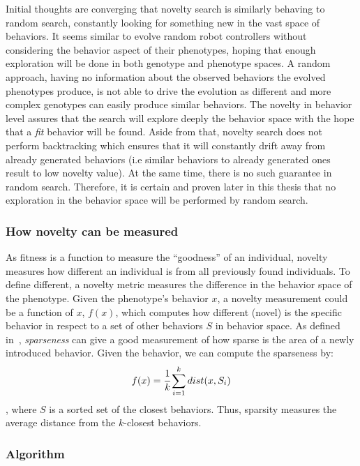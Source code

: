 Initial thoughts are converging that novelty search is similarly behaving to random search, constantly looking for something new in the vast space of behaviors. It seems similar to evolve random robot controllers without considering the behavior aspect of their phenotypes, hoping that enough exploration will be done in both genotype and phenotype spaces. A random approach, having no information about the observed behaviors the evolved phenotypes produce, is not able to drive the evolution as different and more complex genotypes can easily produce similar behaviors. The novelty in behavior level assures that the search will explore deeply the behavior space with the hope that a \emph{fit} behavior will be found. Aside from that, novelty search does not perform backtracking which ensures that it will constantly drift away from already generated behaviors (i.e similar behaviors to already generated ones result to low novelty value). At the same time, there is no such guarantee in random search. Therefore, it is certain and proven later in this thesis that no exploration in the behavior space will be performed by random search.



\subsubsection*{How novelty can be measured}

As fitness is a function to measure the ``goodness'' of an individual, novelty measures how different an individual is from all previously found individuals. To define different, a novelty metric measures the difference in the behavior space of the phenotype. Given the phenotype's behavior $x$, a novelty measurement could be a function of $x$, $f(x)$, which computes how different (novel) is the specific behavior in respect to a set of other behaviors $S$ in behavior space.  As defined in~\citep{lehman2008exploiting,lehman2011abandoning}, \emph{sparseness} can give a good measurement of how sparse is the area of a newly introduced behavior. Given the behavior, we can compute the sparseness by:
\begin{equation}
\label{sparsenessEquation}
f(x) = \cfrac{1}{k} \sum_{i=1}^{k} dist(x, S_i)
\end{equation}
, where $S$ is a sorted set of the closest behaviors. Thus, sparsity measures the average distance from the $k$-closest behaviors.


\subsubsection*{Algorithm}

